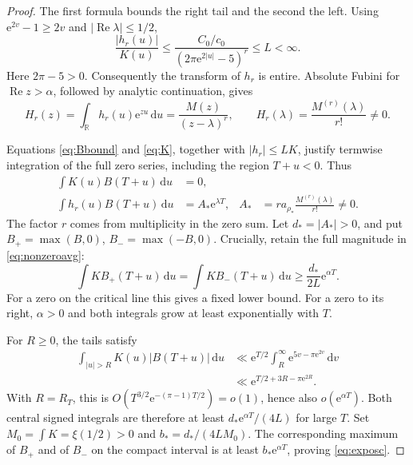 \documentclass[11pt,a4paper]{article}
\theoremstyle{remark}\newtheorem{remark}[theorem]{Remark}
\newcommand{\dd}{\,\mathrm d}
\newcommand{\e}{\mathrm e}
\newcommand{\Rea}{\operatorname{Re}}
\begin{document}
\begin{proof}
The first formula bounds the right tail and the second the left.
Using \(\e^{2v}-1\ge2v\) and \(|\Rea\lambda|\le1/2\),
\[
 \frac{|h_r(u)|}{K(u)}
 \le \frac{C_0/c_0}{(2\pi\e^{2|u|}-5)^r}\le L<\infty.
\]
Here \(2\pi-5>0\). Consequently the transform of \(h_r\)
is entire. Absolute Fubini for \(\Rea z>\alpha\), followed by
analytic continuation, gives
\begin{equation}
 H_r(z)=\int_{\mathbb R}h_r(u)\e^{zu}\dd u
       =\frac{M(z)}{(z-\lambda)^r},\qquad
 H_r(\lambda)=\frac{M^{(r)}(\lambda)}{r!}\ne0.\label{eq:H}
\end{equation}

Equations \eqref{eq:Bbound} and \eqref{eq:K}, together with
\(|h_r|\le LK\), justify termwise integration of the full zero
series, including the region \(T+u<0\). Thus
\begin{align}
 \int K(u)B(T+u)\dd u&=0,\label{eq:zeroavg}\\
 \int h_r(u)B(T+u)\dd u
   &=A_*\e^{\lambda T},&
 A_*&=r a_{\rho_*}\frac{M^{(r)}(\lambda)}{r!}\ne0.
 \label{eq:nonzeroavg}
\end{align}
The factor \(r\) comes from multiplicity in the zero sum.
Let \(d_*=|A_*|>0\), and put \(B_+=\max(B,0)\),
\(B_-=\max(-B,0)\). Crucially, retain the full magnitude in
\eqref{eq:nonzeroavg}:
\begin{equation}
 \int K B_+(T+u)\dd u
 =\int K B_-(T+u)\dd u
 \ge\frac{d_*}{2L}\e^{\alpha T}.\label{eq:massgrowth}
\end{equation}
For a zero on the critical line this gives a fixed lower bound.
For a zero to its right, \(\alpha>0\) and both integrals grow at
least exponentially with \(T\).

For \(R\ge0\), the tails satisfy
\begin{align*}
 \int_{|u|>R}K(u)|B(T+u)|\dd u
 &\ll\e^{T/2}\int_R^\infty\e^{5v-\pi\e^{2v}}\dd v\\
 &\ll\e^{T/2+3R-\pi\e^{2R}}.
\end{align*}
With \(R=R_T\), this is
\(O(T^{3/2}\e^{-(\pi-1)T/2})=o(1)\), hence also
\(o(\e^{\alpha T})\). Both central signed integrals are
therefore at least \(d_*\e^{\alpha T}/(4L)\) for large \(T\).
Set \(M_0=\int K=\xi(1/2)>0\) and
\(b_*=d_*/(4LM_0)\). The corresponding maximum of \(B_+\)
and of \(B_-\) on the compact interval is at least
\(b_*\e^{\alpha T}\), proving \eqref{eq:exposc}.
\end{proof}
\end{document}
